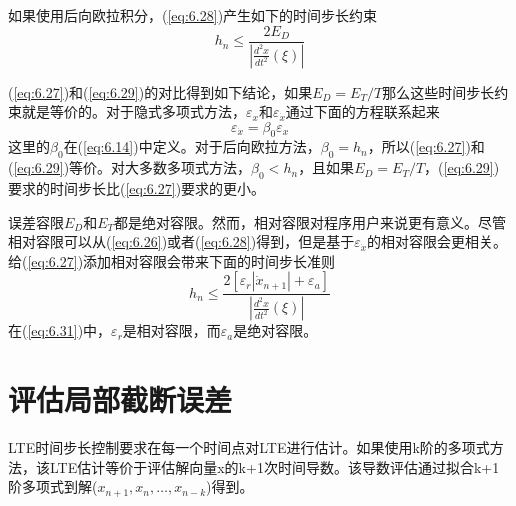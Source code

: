 如果使用后向欧拉积分，(\ref{eq:6.28})产生如下的时间步长约束
\begin{equation}
    h_n \leq \frac{2E_D}{|\frac{d^2x}{dt^2}(\xi)|}
    \label{eq:6.29}
\end{equation}

(\ref{eq:6.27})和(\ref{eq:6.29})的对比得到如下结论，如果$E_D = E_T/T$那么这些时间步长约束就是等价的。对于隐式多项式方法，$\varepsilon_x$和$\varepsilon_{\dot{x}}$通过下面的方程联系起来
\begin{equation}
    \varepsilon_{\dot{x}} = \beta_0 \varepsilon_x
    \label{eq:6.30}
\end{equation}
这里的$\beta_0$在(\ref{eq:6.14})中定义。对于后向欧拉方法，$\beta_0 = h_n$，所以(\ref{eq:6.27})和(\ref{eq:6.29})等价。对大多数多项式方法，$\beta_0 < h_n$，且如果$E_D = E_T/T$，(\ref{eq:6.29})要求的时间步长比(\ref{eq:6.27})要求的更小。

误差容限$E_D$和$E_T$都是绝对容限。然而，相对容限对程序用户来说更有意义。尽管相对容限可以从(\ref{eq:6.26})或者(\ref{eq:6.28})得到，但是基于$\varepsilon_{\dot{x}}$的相对容限会更相关。给(\ref{eq:6.27})添加相对容限会带来下面的时间步长准则
\begin{equation}
    h_n \leq \frac{2[\varepsilon_r |\dot{x}_{n+1}|+\varepsilon_a]}{|\frac{d^2x}{dt^2}(\xi)|}
    \label{eq:6.31}
\end{equation}
在(\ref{eq:6.31})中，$\varepsilon_r$是相对容限，而$\varepsilon_a$是绝对容限。

\section{评估局部截断误差}
LTE时间步长控制要求在每一个时间点对LTE进行估计。如果使用k阶的多项式方法，该LTE估计等价于评估解向量x的k+1次时间导数。该导数评估通过拟合k+1阶多项式到解($x_{n+1},x_n,\dots,x_{n-k}$)得到。

